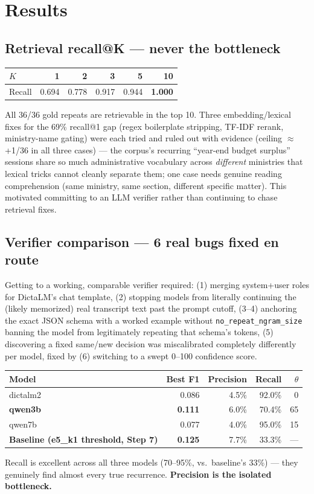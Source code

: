 \documentclass[11pt,a4paper]{article}
\begin{document}
\section{Results}

\subsection{Retrieval recall@K --- never the bottleneck}
\begin{center}
\begin{tabular}{lrrrrr}
\toprule
$K$ & 1 & 2 & 3 & 5 & 10 \\
\midrule
Recall & 0.694 & 0.778 & 0.917 & 0.944 & \textbf{1.000} \\
\bottomrule
\end{tabular}
\end{center}
All 36/36 gold repeats are retrievable in the top 10. Three embedding/lexical fixes for the 69\%
recall@1 gap (regex boilerplate stripping, TF-IDF rerank, ministry-name gating) were each tried
and ruled out with evidence (ceiling $\approx$+1/36 in all three cases) --- the corpus's
recurring ``year-end budget surplus'' sessions share so much administrative vocabulary across
\emph{different} ministries that lexical tricks cannot cleanly separate them; one case needs
genuine reading comprehension (same ministry, same section, different specific matter). This
motivated committing to an LLM verifier rather than continuing to chase retrieval fixes.

\subsection{Verifier comparison --- 6 real bugs fixed en route}
Getting to a working, comparable verifier required: (1) merging system+user roles for
DictaLM's chat template, (2) stopping models from literally continuing the (likely memorized)
real transcript text past the prompt cutoff, (3--4) anchoring the exact JSON schema with a
worked example without \texttt{no\_repeat\_ngram\_size} banning the model from legitimately
repeating that schema's tokens, (5) discovering a fixed same/new decision was miscalibrated
completely differently per model, fixed by (6) switching to a swept 0--100 confidence score.

\begin{center}
\begin{tabular}{lrrrr}
\toprule
\textbf{Model} & \textbf{Best F1} & \textbf{Precision} & \textbf{Recall} & \textbf{$\theta$} \\
\midrule
dictalm2 & 0.086 & 4.5\% & 92.0\% & 0 \\
\textbf{qwen3b} & \textbf{0.111} & 6.0\% & 70.4\% & 65 \\
qwen7b & 0.077 & 4.0\% & 95.0\% & 15 \\
\midrule
\textbf{Baseline (e5\_k1 threshold, Step 7)} & \textbf{0.125} & 7.7\% & 33.3\% & --- \\
\bottomrule
\end{tabular}
\end{center}
Recall is excellent across all three models (70--95\%, vs.\ baseline's 33\%) --- they genuinely
find almost every true recurrence. \textbf{Precision is the isolated bottleneck.}
\end{document}
